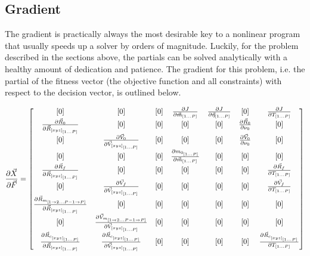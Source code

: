 \subsection{Gradient}
The gradient is practically always the most desirable key to a nonlinear program that usually speeds up a solver by orders of magnitude. Luckily, for the problem described in the sections above, the partials can be solved analytically with a healthy amount of dedication and patience. The gradient for this problem, i.e. the partial of the fitness vector (the objective function and all constraints) with respect to the decision vector, is outlined below.

\begin{equation}
\pdv{\vec{X}}{\vec{F}} = 
\begin{bmatrix}

[0] &
[0] &
[0] &
\pdv{J}{\vec{m}_{[1 ... P]}} &
\pdv{J}{\vec{\eta}_{[1 ... P]}} &
[0]  &
\pdv{J}{T_{[1 ... P]}} \\


\pdv{\vec{R}_0}{\vec{R}_{[xyz]_{[1 ... P]}}} &
[0] &
[0] &
[0] &
[0] &
\pdv{\vec{R}_0}{\nu_0}  &
[0] \\

[0] &
\pdv{\vec{V}_0}{\vec{V}_{[xyz]_{[1 ... P]}}} &
[0] &
[0] &
[0] &
\pdv{\vec{V}_0}{\nu_0}  &
[0] \\

[0] &
[0] &
[0] &
\pdv{m_{0_{[1 ... P]}}}{\vec{m}_{[1 ... P]}} &
[0] &
[0] &
[0]  \\

\pdv{\vec{R}_f}{\vec{R}_{[xyz]_{[1 ... P]}}} &
[0] &
[0] &
[0] &
[0] &
[0] &
\pdv{\vec{R}_f}{T_{[1 ... P]}} \\

[0] &
\pdv{\vec{V}_f}{\vec{V}_{[xyz]_{[1 ... P]}}} &
[0] &
[0] &
[0] &
[0] &
\pdv{\vec{V}_f}{T_{[1 ... P]}} \\

\pdv{\vec{R}_{m_{[1 \rightarrow 2 ... P-1 \rightarrow P]}}}{\vec{R}_{[xyz]_{[1 ... P]}}} &
[0] &
[0] &
[0] &
[0] &
[0] &
[0]  \\

[0] &
\pdv{\vec{V}_{m_{[1 \rightarrow 2 ... P-1 \rightarrow P]}}}{\vec{V}_{[xyz]_{[1 ... P]}}} &
[0] &
[0] &
[0] &
[0] &
[0]  \\

\pdv{\vec{R}_{c_{[xyz]_{[1 ... P]}}}}{\vec{R}_{[xyz]_{[1 ... P]}}} &
\pdv{\vec{R}_{c_{[xyz]_{[1 ... P]}}}}{\vec{V}_{[xyz]_{[1 ... P]}}} &
[0] &
[0] &
[0] &
[0] &
\pdv{\vec{R}_{c_{[xyz]_{[1 ... P]}}}}{T_{[1 ... P]}} \\


\end{bmatrix}
\end{equation}
